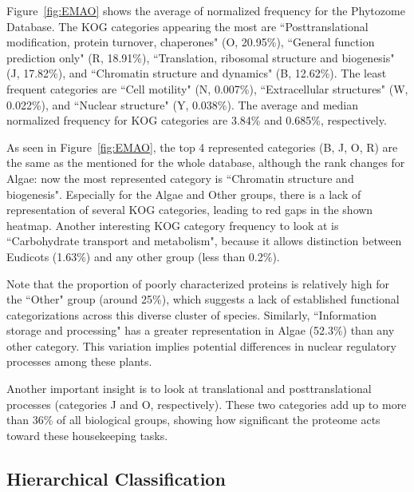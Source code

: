 Figure~\ref{fig:EMAO} shows the average of normalized frequency 
for the Phytozome Database. The KOG categories 
appearing the most are ``Posttranslational modification, 
protein turnover, chaperones" (O, 20.95\%), ``General function 
prediction only" (R, 18.91\%), ``Translation, ribosomal 
structure and biogenesis" (J, 17.82\%), and ``Chromatin 
structure and dynamics" (B, 12.62\%). The least frequent 
categories are ``Cell motility" (N, 0.007\%), ``Extracellular 
structures" (W, 0.022\%), and ``Nuclear structure" 
(Y, 0.038\%). The average and median normalized frequency 
for KOG categories are 3.84\% and 0.685\%, respectively. 

As seen in Figure~\ref{fig:EMAO}, the top 4 represented 
categories (B, J, O, R) are the same as the mentioned for the 
whole database, although the rank changes for Algae: now the 
most represented category is ``Chromatin structure and 
biogenesis". Especially for the Algae and Other groups, there 
is a lack of representation of several KOG categories, 
leading to red gaps in the shown heatmap.
Another interesting KOG category frequency to look at is 
``Carbohydrate transport and metabolism", because it 
allows distinction between Eudicots (1.63\%) and any other 
group (less than 0.2\%).

Note that the proportion of poorly characterized proteins 
is relatively high for the ``Other" group (around 25\%), 
which suggests a lack of established functional 
categorizations across this diverse cluster of species. 
Similarly, ``Information storage and processing" has a 
greater representation in Algae (52.3\%) than any other 
category. This variation implies potential differences 
in nuclear regulatory processes among these plants.

Another important insight is to look at translational 
and posttranslational processes (categories J and O, 
respectively). These two categories add up to more than 
36\% of all biological groups, showing how significant the 
proteome acts toward these housekeeping tasks.


\subsection{Hierarchical Classification}
\label{sec:results.hierarchy}


